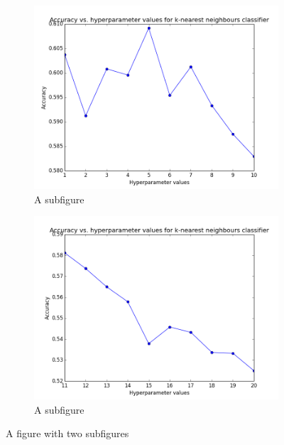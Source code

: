 \documentclass{article} %
\begin{document}
\begin{figure}[H]
\centering
\begin{subfigure}{.4\textwidth}
  \centering
  \includegraphics[width=.9\linewidth]{hyperparameter_knn_1_10.png}
  \caption{A subfigure}
  \label{fig:sub1}
\end{subfigure}%
\begin{subfigure}{.4\textwidth}
  \centering
  \includegraphics[width=.9\linewidth]{hyperparameter_knn_11_20.png}
  \caption{A subfigure}
  \label{fig:sub2}
\end{subfigure}
\caption{A figure with two subfigures}
\label{fig:test}
\end{figure}
\end{document}
